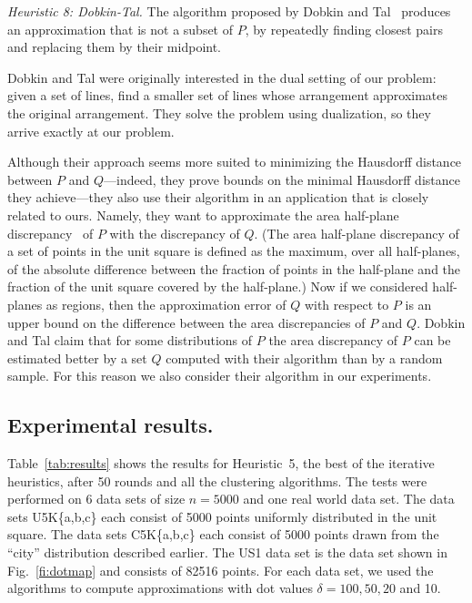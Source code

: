\documentclass{elsart}
\begin{document}
\emph{Heuristic 8: Dobkin-Tal.}
The algorithm proposed by Dobkin and Tal~\cite{dt-esrla-01} produces
an approximation that is not a subset of $P$, by repeatedly finding
closest pairs and replacing them by their midpoint.

Dobkin and Tal were originally interested in the dual setting of our
problem: given a set of lines, find a smaller set of lines whose
arrangement approximates the original arrangement.  They solve the
problem using dualization, so they arrive exactly at our
problem. 

Although their approach seems more suited to minimizing the Hausdorff
distance between $P$ and $Q$---indeed, they prove bounds on the
minimal Hausdorff distance they achieve---they also use their
algorithm in an application that is closely related to ours.  Namely,
they want to approximate the area half-plane discrepancy~\cite{c01} of
$P$ with the discrepancy of $Q$. (The area half-plane discrepancy of a
set of points in the unit square is defined as the maximum, over all
half-planes, of the absolute difference between the fraction of points
in the half-plane and the fraction of the unit square covered by the
half-plane.)  Now if we considered half-planes as regions, then the
approximation error of $Q$ with respect to $P$ is an upper bound on
the difference between the area discrepancies of $P$ and $Q$.  Dobkin
and Tal claim that for some distributions of $P$ the area discrepancy
of $P$ can be estimated better by a set $Q$ computed with their
algorithm than by a random sample. For this reason we also consider
their algorithm in our experiments.

\subsection{Experimental results.}

Table~\ref{tab:results} shows the results for Heuristic~5, the best of
the iterative heuristics, after 50 rounds and all the clustering
algorithms.  The tests were performed on 6 data sets of size $n=5000$
and one real world data set.  The data sets U5K\{a,b,c\} each consist
of 5000 points uniformly distributed in the unit square.  The data
sets C5K\{a,b,c\} each consist of 5000 points drawn from the ``city''
distribution described earlier.  The US1 data set is the data set
shown in Fig.~\ref{fi:dotmap} and consists of 82516 points.  For each
data set, we used the algorithms to compute approximations with dot
values $\delta=100,50,20$ and 10.
\end{document}
